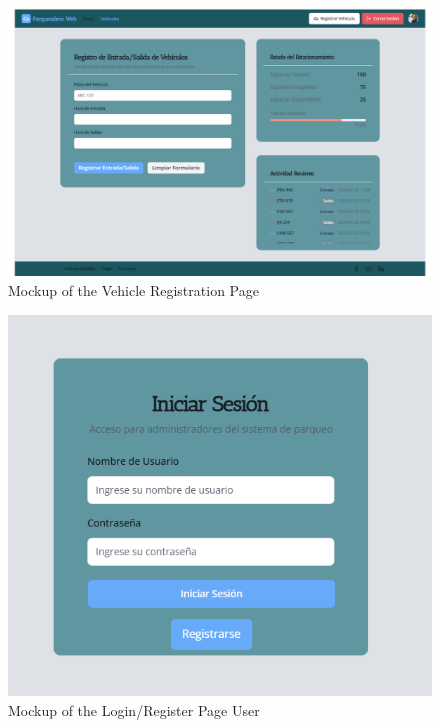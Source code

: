 \begin{figure}[h]
    \centering
    \includegraphics[width=0.8\linewidth]{methods/images/Mockup_Vehicle_Registration.png}
    \caption{Mockup of the Vehicle Registration Page}
\end{figure}

\begin{figure}[h]
    \centering
    \includegraphics[width=0.8\linewidth]{methods/images/Mockup_Login.png}
    \caption{Mockup of the Login/Register Page User}
\end{figure}

